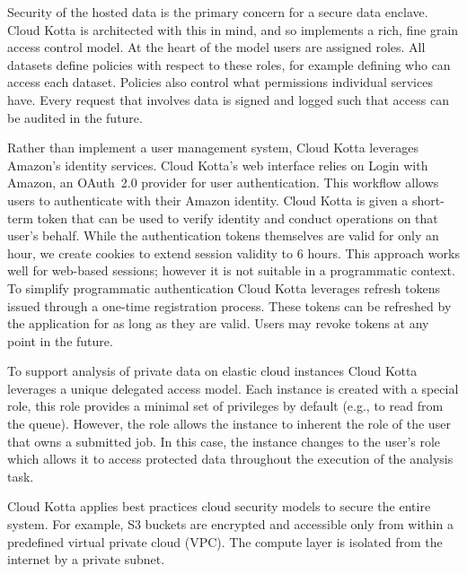 Security of the hosted data is the primary concern for a secure data enclave. Cloud Kotta is architected with
this in mind, and so implements a rich, fine grain access control model. 
At the heart of the model users are assigned roles. All datasets define policies
with respect to these roles, for example defining who can access each dataset.
Policies also control what permissions individual services have. 
Every request that involves data is signed and logged such that 
access can be audited in the future.

Rather than implement a user management system, Cloud Kotta leverages 
Amazon's identity services. Cloud Kotta's web interface 
relies on Login with Amazon, an OAuth~2.0 provider for user authentication. 
This workflow allows users to authenticate with their Amazon identity. 
Cloud Kotta is given a short-term token that can be used to verify identity
and conduct operations on that user's behalf. While the authentication
tokens themselves are valid for only an hour, we create cookies to extend 
session validity to 6 hours. This approach works well for web-based sessions; 
however it is not suitable in a programmatic context. To simplify programmatic
authentication Cloud Kotta leverages refresh tokens issued through a one-time registration
process. These tokens can be refreshed by the application for as long as they
are valid. Users may revoke tokens at any point in the future. 

To support analysis of private data on elastic cloud instances Cloud
Kotta leverages a unique delegated access model. Each instance is 
created with a special role, this role provides a minimal set of 
privileges by default (e.g., to read from the queue). However, the role
allows the instance to inherent the role of the user that owns a submitted
job. In this case, the instance changes to the user's role which 
allows it to access protected data throughout the execution of the 
analysis task.  

Cloud Kotta applies best practices cloud security models to secure
the entire system. For example, S3 buckets are encrypted and 
accessible only from within a predefined virtual private cloud (VPC). 
The compute layer is isolated from the internet by a private subnet. 



